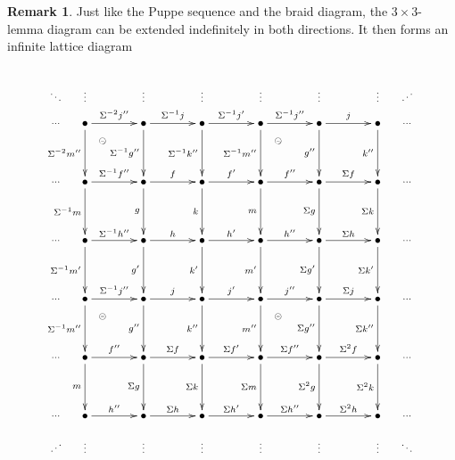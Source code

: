\documentclass{amsproc}
\theoremstyle{definition}
\newtheorem{rem}[prop]{Remark}
\begin{document}
\begin{rem}
Just like the Puppe sequence and the braid diagram, the $3\!\!\times\!\! 3$-lemma diagram can be extended indefinitely in both directions. It then forms an infinite lattice diagram
\begin{displaymath}
\xymatrix@!@+12pt{\ar@{}[dr]|{\ddots} & \ar@{}[d]|\vdots & {}\ar@{}[d]|\vdots & {}\ar@{}[d]|\vdots & {}\ar@{}[d]|\vdots & {}\ar@{}[d]|\vdots & {}\ar@{}[d]|\vdots & \ar@{}[dl]|\iddots\\{}
\ar@{}[r]|\ldots & {\bullet}\ar[r]^{\Sigma^{-2}j''}\ar[d]_{\Sigma^{-2}m''}\ar@{}[rd]|(.3)\circleddash & {\bullet}\ar[r]^{\Sigma^{-1}j}\ar[d]_{\Sigma^{-1}g''} & {\bullet}\ar[r]^{\Sigma^{-1}j'}\ar[d]_{\Sigma^{-1}k''} & {\bullet}\ar[r]^{\Sigma^{-1}j''}\ar[d]_{\Sigma^{-1}m''}\ar@{}[rd]|(.3)\circleddash & {\bullet}\ar[r]^j\ar[d]_{g''} & {\bullet}\ar[d]_{k''} & \ar@{}[l]|\ldots\\
\ar@{}[r]|\ldots&{\bullet}\ar[r]^{\Sigma^{-1}f''}\ar[d]_{\Sigma^{-1}m} & {\bullet}\ar[r]^f\ar[d]_g & {\bullet}\ar[r]^{f'}\ar[d]_k & {\bullet}\ar[r]^{f''}\ar[d]_m & {\bullet}\ar[r]^{\Sigma f}\ar[d]_{\Sigma g} & {\bullet}\ar[d]_{\Sigma k} & \ar@{}[l]|\ldots\\
\ar@{}[r]|\ldots&{\bullet}\ar[r]^{\Sigma^{-1}h''}\ar[d]_{\Sigma^{-1}m'} & {\bullet}\ar[r]^h\ar[d]_{g'} & {\bullet}\ar[r]^{h'}\ar[d]_{k'} & {\bullet}\ar[r]^{h''}\ar[d]_{m'} & {\bullet}\ar[r]^{\Sigma h}\ar[d]_{\Sigma g'} & {\bullet}\ar[d]_{\Sigma k'} &{}\ar@{}[l]|\ldots\\
\ar@{}[r]|\ldots&{\bullet}\ar[r]^{\Sigma^{-1}j''}\ar[d]_{\Sigma^{-1}m''}\ar@{}[rd]|(.3)\circleddash & {\bullet}\ar[r]^j\ar[d]_{g''} & {\bullet}\ar[r]^{j'}\ar[d]_{k''} & {\bullet}\ar[r]^{j''}\ar[d]_{m''}\ar@{}[rd]|(.3)\circleddash & {\bullet}\ar[r]^{\Sigma j}\ar[d]_{\Sigma g''} & {\bullet}\ar[d]_{\Sigma k''} &{}\ar@{}[l]|\ldots\\
\ar@{}[r]|\ldots&{\bullet}\ar[r]^{f''}\ar[d]_{m} & {\bullet}\ar[r]^{\Sigma f}\ar[d]_{\Sigma g} & {\bullet}\ar[r]^{\Sigma f'}\ar[d]_{\Sigma k} & {\bullet}\ar[r]^{\Sigma f''}\ar[d]_{\Sigma m} & {\bullet}\ar[r]^{\Sigma^2 f}\ar[d]_{\Sigma^2 g} & {\bullet}\ar[d]_{\Sigma^2 k} &{}\ar@{}[l]|\ldots\\
\ar@{}[r]|\ldots&{\bullet}\ar[r]^{h''} & {\bullet}\ar[r]^{\Sigma h} & {\bullet}\ar[r]^{\Sigma h'} & {\bullet}\ar[r]^{\Sigma h''} & {\bullet}\ar[r]^{\Sigma^2h} & {\bullet}&{}\ar@{}[l]|\ldots\\
\ar@{}[ur]|\iddots & {}\ar@{}[u]|\vdots & {}\ar@{}[u]|\vdots & {}\ar@{}[u]|\vdots & {}\ar@{}[u]|\vdots & {}\ar@{}[u]|\vdots & {}\ar@{}[u]|\vdots &{}\ar@{}[ul]|\ddots}

\end{displaymath}
\end{rem}
\end{document}
